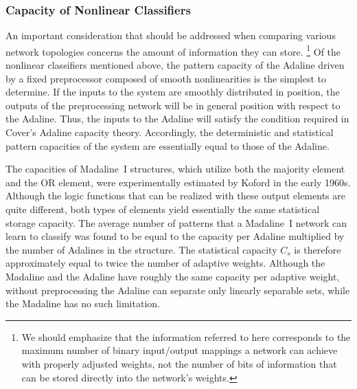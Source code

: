 \documentclass[10pt,twocolumn]{article}
\begin{document}
\subsubsection*{Capacity of Nonlinear Classifiers}
An important consideration that should be addressed when comparing various
network topologies concerns the amount of information they can store.%
\footnote{We should emphasize that the information referred to here corresponds
to the maximum number of binary input/output mappings a network can achieve with
properly adjusted weights, not the number of bits of information that can be
stored directly into the network's weights.}
Of the nonlinear classifiers mentioned above, the pattern capacity of the
Adaline driven by a fixed preprocessor composed of smooth nonlinearities is the
simplest to determine. If the inputs to the system are smoothly distributed in
position, the outputs of the preprocessing network will be in general position
with respect to the Adaline. Thus, the inputs to the Adaline will satisfy the
condition required in Cover's Adaline capacity theory. Accordingly, the
deterministic and statistical pattern capacities of the system are essentially
equal to those of the Adaline.

The capacities of Madaline~I structures, which utilize both the majority element
and the OR element, were experimentally estimated by Koford in the early 1960s.
Although the logic functions that can be realized with these output elements are
quite different, both types of elements yield essentially the same statistical
storage capacity. The average number of patterns that a Madaline~I network can
learn to classify was found to be equal to the capacity per Adaline multiplied by
the number of Adalines in the structure. The statistical capacity $C_s$ is
therefore approximately equal to twice the number of adaptive weights. Although
the Madaline and the Adaline have roughly the same capacity per adaptive weight,
without preprocessing the Adaline can separate only linearly separable sets,
while the Madaline has no such limitation.
\end{document}
